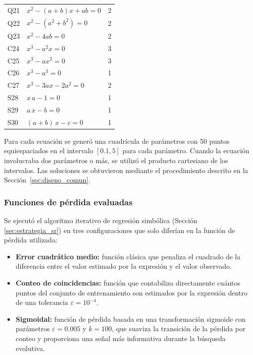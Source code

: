 \documentclass[12pt,a4paper]{article} \usepackage[utf8]{inputenc} \usepackage[spanish]{babel} \usepackage{amsmath, amssymb, amsthm} \usepackage{bm} \usepackage{float} \usepackage{longtable} \usepackage[hidelinks]{hyperref}
\begin{document}
\begin{longtable}{llc}
Q21 & $x^2 - (a+b)x + a b = 0$ & 2 \\
Q22 & $x^2 - (a^2+b^2) = 0$ & 2 \\
Q23 & $x^2 - 4a b = 0$ & 2 \\
C24 & $x^3 - a^2 x = 0$ & 3 \\
C25 & $x^3 - a x^2 = 0$ & 3 \\
C26 & $x^3 - a^3 = 0$ & 1 \\
C27 & $x^3 - 3a x - 2a^2 = 0$ & 2 \\
S28 & $x\,a - 1 = 0$ & 1 \\
S29 & $a\,x - b = 0$ & 1 \\
S30 & $(a+b)\,x - c = 0$ & 1 \\
\end{longtable}

Para cada ecuación se generó una cuadrícula de parámetros con 50 puntos equiespaciados en el intervalo $[0.1, 5]$ para cada parámetro. Cuando la ecuación involucraba dos parámetros o más, se utilizó el producto cartesiano de los intervalos. Las soluciones se obtuvieron mediante el procedimiento descrito en la Sección~\ref{sec:diseno_comun}.

\subsubsection{Funciones de pérdida evaluadas}

Se ejecutó el algoritmo iterativo de regresión simbólica (Sección \ref{sec:estrategia_sr}) en tres configuraciones que solo diferían en la función de pérdida utilizada:

\begin{itemize}
 \item \textbf{Error cuadrático medio:} función clásica que penaliza el cuadrado de la diferencia entre el valor estimado por la expresión y el valor observado.

 \item \textbf{Conteo de coincidencias:} función que contabiliza directamente cuántos puntos del conjunto de entrenamiento son estimados por la expresión dentro de una tolerancia $\varepsilon = 10^{-4}$.

 \item \textbf{Sigmoidal:} función de pérdida basada en una transformación sigmoide con parámetros $\varepsilon = 0.005$ y $k = 100$, que suaviza la transición de la pérdida por conteo y proporciona una señal más informativa durante la búsqueda evolutiva.
\end{itemize}
\end{document}
